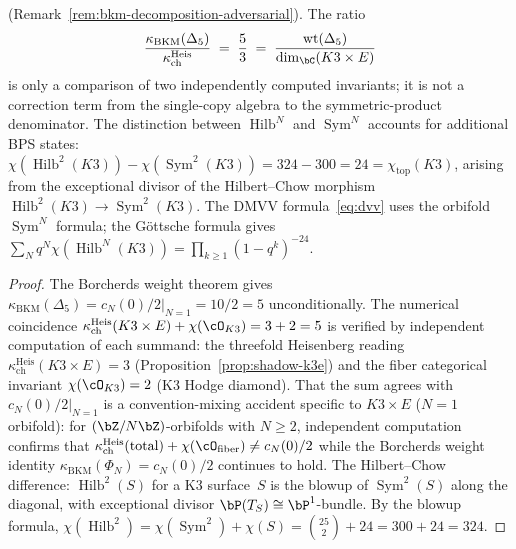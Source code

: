 \begin{proposition}
\textup{(}Remark~\textup{\ref{rem:bkm-decomposition-adversarial})}.
The ratio
\[
\frac{\kappa_{\mathrm{BKM}}(\Delta_5)}{\kappa_{\mathrm{ch}}^{\mathrm{Heis}}}
\;=\; \frac{5}{3}
\;=\; \frac{\operatorname{wt}(\Delta_5)}{\dim_\bC(K3 \times E)}
\]
is only a comparison of two independently computed invariants; it is
not a correction term from the single-copy algebra to the
symmetric-product denominator.
The distinction between $\operatorname{Hilb}^N$ and
$\operatorname{Sym}^N$ accounts for additional BPS states:
$\chi(\operatorname{Hilb}^2(K3)) - \chi(\operatorname{Sym}^2(K3))
= 324 - 300 = 24 = \chi_{\mathrm{top}}(K3)$, arising from the exceptional
divisor of the Hilbert--Chow morphism
$\operatorname{Hilb}^2(K3) \to \operatorname{Sym}^2(K3)$.
The DMVV formula~\eqref{eq:dvv} uses the orbifold
$\operatorname{Sym}^N$ formula; the G\"ottsche formula gives
$\sum_N q^N \chi(\operatorname{Hilb}^N(K3))
= \prod_{k \geq 1}(1-q^k)^{-24}$.
\end{proposition}

\begin{proof}
The Borcherds weight theorem gives
$\kappa_{\mathrm{BKM}}(\Delta_5) = \left.c_N(0)/2\right|_{N=1} = 10/2 = 5$ unconditionally.
The numerical coincidence
$\kappa_{\mathrm{ch}}^{\mathrm{Heis}}(K3 \times E) + \chi(\cO_{K3}) = 3 + 2 = 5$
is verified by independent computation of each summand: the
threefold Heisenberg reading
$\kappa_{\mathrm{ch}}^{\mathrm{Heis}}(K3 \times E) = 3$
\textup{(}Proposition~\ref{prop:shadow-k3e}\textup{)} and the fiber
categorical invariant $\chi(\cO_{K3}) = 2$
\textup{(}K3 Hodge diamond\textup{)}.
That the sum agrees with $\left.c_N(0)/2\right|_{N=1}$ is a convention-mixing accident
specific to $K3 \times E$ \textup{(}$N = 1$ orbifold\textup{)}: for
$(\bZ/N\bZ)$-orbifolds with $N \geq 2$,
independent computation confirms that
$\kappa_{\mathrm{ch}}^{\mathrm{Heis}}(\mathrm{total}) +
\chi(\cO_{\mathrm{fiber}}) \neq c_N(0)/2$
while the Borcherds weight identity $\kappa_{\mathrm{BKM}}(\Phi_N) = c_N(0)/2$
continues to hold.
The Hilbert--Chow difference: $\operatorname{Hilb}^2(S)$
for a K3 surface~$S$ is the blowup of $\operatorname{Sym}^2(S)$
along the diagonal, with exceptional divisor
$\bP(T_S) \cong \bP^1$-bundle. By the blowup formula,
$\chi(\operatorname{Hilb}^2) = \chi(\operatorname{Sym}^2)
+ \chi(S) = \binom{25}{2} + 24 = 300 + 24 = 324$.
\end{proof}

